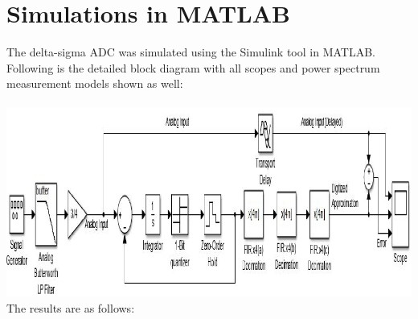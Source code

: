 \documentclass[colorlinks=true,pdfstartview=FitV,linkcolor=blue,
            citecolor=red,urlcolor=magenta]{ligodoc}
\begin{document}
\section{Simulations in MATLAB}
The delta-sigma ADC was simulated using the Simulink tool in MATLAB.
Following is the detailed block diagram with all scopes and power spectrum measurement models shown as well: \\ \\
\includegraphics[scale=0.5]{Sigma_Delta_ADC_Simulink_Implementation}
The results are as follows:
\end{document}
